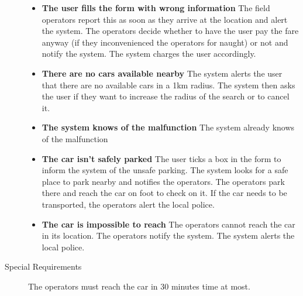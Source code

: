 \begin{description}
			\begin{itemize}
				\item \textbf{The user fills the form with wrong information} The field operators report this as soon as they arrive at the location and alert the system. The operators decide whether to have the user pay the fare anyway (if they inconvenienced the operators for naught) or not and notify the system. The system charges the user accordingly.
				\item \textbf{There are no cars available nearby} The system alerts the user that there are no available cars in a 1km radius. The system then asks the user if they want to increase the radius of the search or to cancel it.
				\item \textbf{The system knows of the malfunction} The system already knows of the malfunction %
				\item \textbf{The car isn't safely parked} The user ticks a box in the form to inform the system of the unsafe parking. The system looks for a safe place to park nearby and notifies the operators. The operators park there and reach the car on foot to check on it. If the car needs to be transported, the operators alert the local police. 
				\item \textbf{The car is impossible to reach} The operators cannot reach the car in its location. The operators notify the system. The system alerts the local police. 
			\end{itemize}
			\item[Special Requirements] The operators must reach the car in 30 minutes time at most.
		\end{description}

